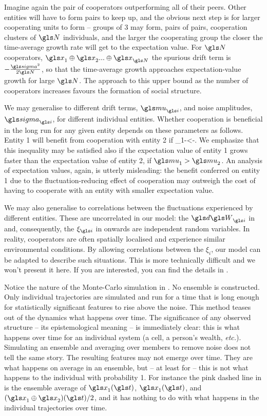 Imagine again the pair of cooperators outperforming all of their peers. Other
entities will have to form pairs to keep up, and the obvious next step is for larger
cooperating units to form -- groups of 3 may form, pairs of pairs, cooperation 
clusters of $\N$ individuals, and the larger the cooperating group the closer the
time-average growth rate will get to the expectation value.
For $\N$ cooperators, $\x_1\oplus \x_2 ... \oplus \x_\N$ the spurious drift term is 
$-\frac{\gsigma^2}{2\N}$, so that the time-average growth approaches 
expectation-value growth for large $\N$. The approach to this upper bound as 
the number of cooperators increases favours the formation of social structure. 

We may generalise to different drift 
terms, $\gmu_\gi$, and noise amplitudes, $\gsigma_\gi$, for different individual entities. 
Whether cooperation is beneficial in the long run for any
given entity depends on these parameters as follows. Entity 1 
will benefit from cooperation with entity 2 if 
\be
\gmu_1-<-.
\ee
We emphasize that this inequality may be satisfied also if the expectation value
of entity 1 grows faster than the expectation value of entity 2, \ie if
$\gmu_1>\gmu_2$. An analysis of expectation values, again, is utterly misleading:
the benefit conferred on entity 1 due to the fluctuation-reducing effect of 
cooperation may outweigh the cost of having to cooperate with an entity with
smaller expectation value.

We may also generalise to correlations between the fluctuations experienced by different entities. These are uncorrelated in our model: the $\gd\gW_\gi$ in  and, consequently, the $\xi_\gi$ in  onwards are independent random variables. In reality, cooperators are often spatially localised and experience similar environmental conditions. By allowing correlations between the $\xi_i$, our model can be adapted to describe such situations. This is more technically difficult and we won't present it here. If you are interested, you can find the details in \cite{PetersAdamou2015a}.
 
Notice the nature of the Monte-Carlo simulation in . No ensemble
is constructed. Only individual trajectories are simulated and run for a time that is 
long enough for statistically significant features to rise above the noise. This method
teases out of the dynamics what happens over time. The significance of any observed 
structure -- its epistemological meaning -- is immediately clear: this is what happens over time
for an individual system (a cell, a person's wealth, {\it etc.}). Simulating an ensemble
and averaging over members to remove noise does not tell the same story. The resulting
features may not emerge over time. They are what happens on average in an ensemble, 
but -- at least for \GBM -- this is not what happens to the individual with probability 1. For instance the 
 pink dashed line in  is the ensemble average of $\x_1(\t)$, $\x_1(\t)$, 
 and $(\x_1 \oplus \x_2)(\t)/2$, and it has nothing to do with what happens 
 in the individual trajectories over time.

